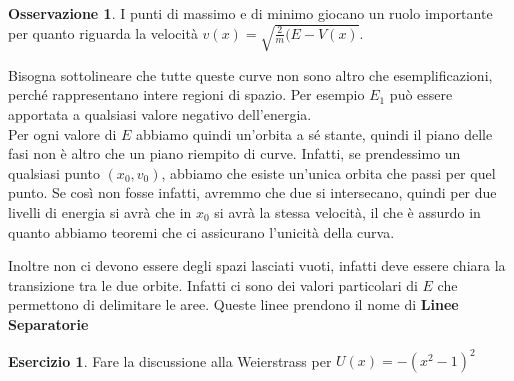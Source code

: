 \documentclass[11pt,a4paper,twoside]{article}
\theoremstyle{definition}
\newtheorem*{oss}{Osservazione}
\newtheorem{ese}{Esercizio}[section]
\begin{document}
\begin{oss}
	I punti di massimo e di minimo giocano un ruolo importante per quanto riguarda la velocità $v(x) = \sqrt{\frac 2m (E-V(x)}$.
\end{oss}

Bisogna sottolineare che tutte queste curve non sono altro che esemplificazioni, perché rappresentano intere regioni di spazio. Per esempio $E_1$ può essere apportata a qualsiasi valore negativo dell'energia.\\
Per ogni valore di $E$ abbiamo quindi un'orbita a sé stante, quindi il piano delle fasi non è altro che un piano riempito di curve.
Infatti, se prendessimo un qualsiasi punto $(x_0, v_0)$, abbiamo che esiste un'unica orbita che passi per quel punto. Se così non fosse infatti, avremmo che due si intersecano, quindi per due livelli di energia si avrà che in $x_0$ si avrà la stessa velocità, il che è assurdo in quanto abbiamo teoremi che ci assicurano l'unicità della curva.

Inoltre non ci devono essere degli spazi lasciati vuoti, infatti deve essere chiara la transizione tra le due orbite. Infatti ci sono dei valori particolari di $E$ che permettono di delimitare le aree. Queste linee prendono il nome di \textbf{Linee Separatorie}

\begin{ese}
	Fare la discussione alla Weierstrass per $U(x) = - (x^2-1)^2$
\end{ese}
\end{document}
